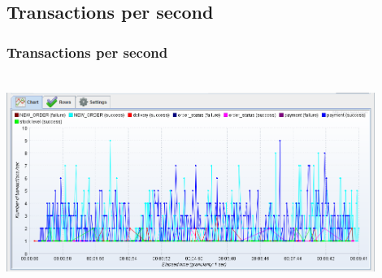 \documentclass[12pt]{beamer}
\begin{document}
\subsection{Transactions per second}
\begin{frame}[c]
\frametitle{Transactions per second}
\centering
   \includegraphics[width=12cm, height=7cm]{images/responseovertime}

\end{frame}


\end{document}
